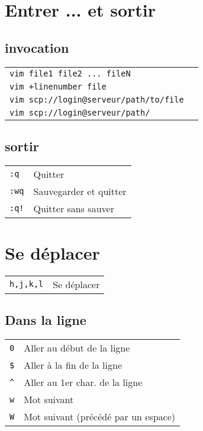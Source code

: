 \documentclass[8pt,landscape,a4paper]{article}
\begin{document}
\small

\begin{multicols*}{3}

    \section{Entrer ... et sortir}

    \subsection{invocation}

    \begin{tabular}{m{7cm} l}
        \texttt{vim file1 file2 ... fileN}   & \\
        \texttt{vim +linenumber file}  & \\
        \texttt{vim scp://login@serveur/path/to/file}  & \\
        \texttt{vim scp://login@serveur/path/}  & \\
    \end{tabular}

    \subsection{sortir}
    \begin{tabular}{m{2cm} l}
        \texttt{:q}   & Quitter\\
        \texttt{:wq}  & Sauvegarder et quitter \\
        \texttt{:q!}  & Quitter sans sauver\\
    \end{tabular}

    \section{Se déplacer}
    \begin{tabular}{m{2cm} l}
        \texttt{h,j,k,l}  & Se déplacer \\
    \end{tabular}
    \subsection{Dans la ligne}
    \begin{tabular}{m{2cm} l}
        \texttt{0}  & Aller au début de la ligne \\
        \texttt{\$} & Aller à la fin de la ligne \\
        \texttt{\^} & Aller au 1er char. de la ligne \\
        \texttt{w}  & Mot suivant\\
        \texttt{W}  & Mot suivant (précédé par un espace)\\
    \end{tabular}

\end{multicols*}
\end{document}
